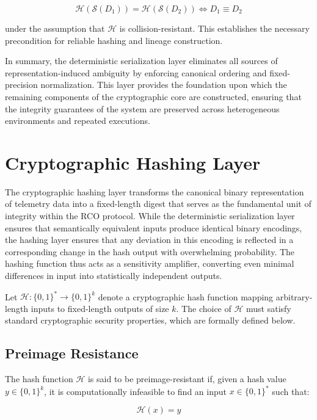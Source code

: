 \begin{equation}
\mathcal{H}(\mathcal{S}(D_1)) = \mathcal{H}(\mathcal{S}(D_2)) \iff D_1 \equiv D_2
\end{equation}

under the assumption that $\mathcal{H}$ is collision-resistant. This establishes the necessary precondition for reliable hashing and lineage construction.

In summary, the deterministic serialization layer eliminates all sources of representation-induced ambiguity by enforcing canonical ordering and fixed-precision normalization. This layer provides the foundation upon which the remaining components of the cryptographic core are constructed, ensuring that the integrity guarantees of the system are preserved across heterogeneous environments and repeated executions.

\section{Cryptographic Hashing Layer}

The cryptographic hashing layer transforms the canonical binary representation of telemetry data into a fixed-length digest that serves as the fundamental unit of integrity within the RCO protocol. While the deterministic serialization layer ensures that semantically equivalent inputs produce identical binary encodings, the hashing layer ensures that any deviation in this encoding is reflected in a corresponding change in the hash output with overwhelming probability. The hashing function thus acts as a sensitivity amplifier, converting even minimal differences in input into statistically independent outputs.

Let $\mathcal{H}: \{0,1\}^* \rightarrow \{0,1\}^k$ denote a cryptographic hash function mapping arbitrary-length inputs to fixed-length outputs of size $k$. The choice of $\mathcal{H}$ must satisfy standard cryptographic security properties, which are formally defined below.

\subsection{Preimage Resistance}

The hash function $\mathcal{H}$ is said to be preimage-resistant if, given a hash value $y \in \{0,1\}^k$, it is computationally infeasible to find an input $x \in \{0,1\}^*$ such that:

\begin{equation}
\mathcal{H}(x) = y
\end{equation}

